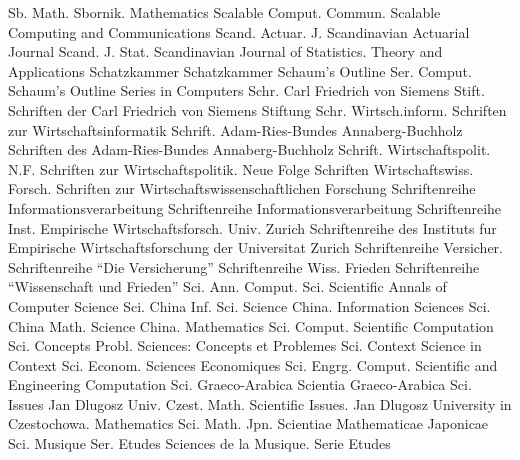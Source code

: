 {Sb. Math.}
{Sbornik. Mathematics}
{Scalable Comput. Commun.}
{Scalable Computing and Communications}
{Scand. Actuar. J.}
{Scandinavian Actuarial Journal}
{Scand. J. Stat.}
{Scandinavian Journal of Statistics. Theory and Applications}
{Schatzkammer}
{Schatzkammer}
{Schaum's Outline Ser. Comput.}
{Schaum's Outline Series in Computers}
{Schr. Carl Friedrich von Siemens Stift.}
{Schriften der Carl Friedrich von Siemens Stiftung}
{Schr. Wirtsch.inform.}
{Schriften zur Wirtschaftsinformatik}
{Schrift. Adam-Ries-Bundes Annaberg-Buchholz}
{Schriften des Adam-Ries-Bundes Annaberg-Buchholz}
{Schrift. Wirtschaftspolit. N.F.}
{Schriften zur Wirtschaftspolitik. Neue Folge}
{Schriften Wirtschaftswiss. Forsch.}
{Schriften zur Wirtschaftswissenschaftlichen Forschung}
{Schriftenreihe Informationsverarbeitung}
{Schriftenreihe Informationsverarbeitung}
{Schriftenreihe Inst. Empirische Wirtschaftsforsch. Univ. Zurich}
{Schriftenreihe des Instituts fur Empirische Wirtschaftsforschung der Universitat Zurich}
{Schriftenreihe Versicher.}
{Schriftenreihe ``Die Versicherung''}
{Schriftenreihe Wiss. Frieden}
{Schriftenreihe ``Wissenschaft und Frieden''}
{Sci. Ann. Comput. Sci.}
{Scientific Annals of Computer Science}
{Sci. China Inf. Sci.}
{Science China. Information Sciences}
{Sci. China Math.}
{Science China. Mathematics}
{Sci. Comput.}
{Scientific Computation}
{Sci. Concepts Probl.}
{Sciences: Concepts et Problemes}
{Sci. Context}
{Science in Context}
{Sci. Econom.}
{Sciences Economiques}
{Sci. Engrg. Comput.}
{Scientific and Engineering Computation}
{Sci. Graeco-Arabica}
{Scientia Graeco-Arabica}
{Sci. Issues Jan Dlugosz Univ. Czest. Math.}
{Scientific Issues. Jan Dlugosz University in Czestochowa. Mathematics}
{Sci. Math. Jpn.}
{Scientiae Mathematicae Japonicae}
{Sci. Musique Ser. Etudes}
{Sciences de la Musique. Serie Etudes}
